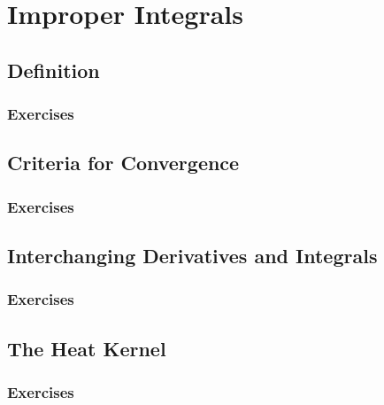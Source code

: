 \setcounter{chapter}{0}
\renewcommand{\thechapter}{13}
\chapter{Improper Integrals}\label{ch:13}
\setcounter{equation}{0}	        %

\section{Definition}\label{sec:13.1}
\subsection*{Exercises}\label{sec:13.1_Exercises}
\section{Criteria for Convergence}\label{sec:13.2}	
\subsection*{Exercises}\label{sec:13.2_Exercises}
\section{Interchanging Derivatives and Integrals}\label{sec:13.3}	
\subsection*{Exercises}\label{sec:13.3_Exercises}
\section{The Heat Kernel}\label{sec:13.4}	
\subsection*{Exercises}\label{sec:13.4_Exercises}
